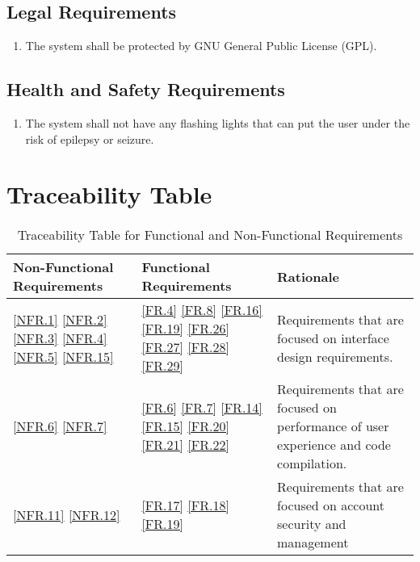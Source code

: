 \documentclass[12pt, titlepage]{article}
\begin{document}
\subsection{Legal Requirements}
\begin{enumerate}[label=NFR.\arabic*, resume]
    \item The system shall be protected by GNU General Public License (GPL). \label{NFR.14}
\end{enumerate}
\subsection{Health and Safety Requirements}
\begin{enumerate}[label=NFR.\arabic*, resume]
    \item The system shall not have any flashing lights that can put the user under the risk of epilepsy or seizure. \label{NFR.15}
\end{enumerate}

\section{Traceability Table}


\begin{table}[H]
    \begin{tabularx}{\textwidth}{|p{3cm}|p{3cm}|X|}
    \hline
    Non-Functional Requirements & Functional Requirements & Rationale \\
    \hline
    \ref{NFR.1} \ref{NFR.2}  \ref{NFR.3} \ref{NFR.4}  \ref{NFR.5} \ref{NFR.15} & \ref{FR.4} \ref{FR.8} \ref{FR.16} \ref{FR.19} \ref{FR.26} \ref{FR.27} \ref{FR.28} \ref{FR.29} & Requirements that are focused on interface design requirements.\\
    \hline
    \ref{NFR.6} \ref{NFR.7}  & \ref{FR.6} \ref{FR.7} \ref{FR.14} \ref{FR.15} \ref{FR.20} \ref{FR.21} \ref{FR.22} & Requirements that are focused on performance of user experience and code compilation.  \\
    \hline
    \ref{NFR.11} \ref{NFR.12} & \ref{FR.17} \ref{FR.18} \ref{FR.19} & Requirements that are focused on account security and management\\
    \hline
    \end{tabularx}
    \caption{Traceability Table for Functional and Non-Functional Requirements}
    \label{tab:trace}
\end{table}
\end{document}
